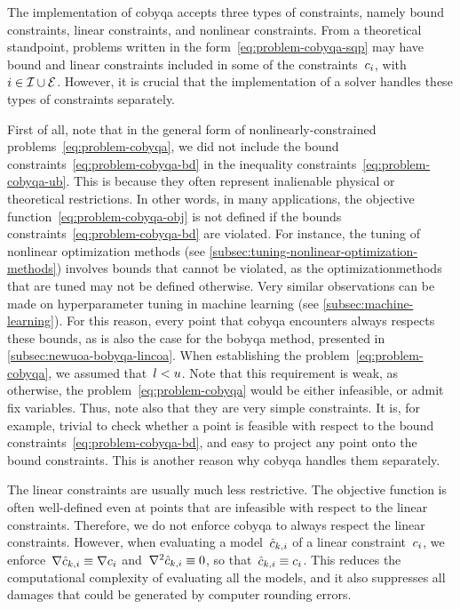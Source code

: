 The implementation of \gls{cobyqa} accepts three types of constraints, namely bound constraints, linear constraints, and nonlinear constraints.
From a theoretical standpoint, problems written in the form~\cref{eq:problem-cobyqa-sqp} may have bound and linear constraints included in some of the constraints~$c_{i}$, with~$i \in \mathcal{I} \cup \mathcal{E}$.
However, it is crucial that the implementation of a solver handles these types of constraints separately.

First of all, note that in the general form of nonlinearly-constrained problems~\cref{eq:problem-cobyqa}, we did not include the bound constraints~\cref{eq:problem-cobyqa-bd} in the inequality constraints~\cref{eq:problem-cobyqa-ub}.
This is because they often represent inalienable physical or theoretical restrictions.
In other words, in many applications, the objective function~\cref{eq:problem-cobyqa-obj} is not defined if the bounds constraints~\cref{eq:problem-cobyqa-bd} are violated.
For instance, the tuning of nonlinear optimization methods (see \cref{subsec:tuning-nonlinear-optimization-methods})  involves bounds that cannot be violated, as the optimizationmethods that are tuned may not be defined otherwise.
Very similar observations can be made on hyperparameter tuning in machine learning (see \cref{subsec:machine-learning}).
For this reason, every point that \gls{cobyqa} encounters always respects these bounds, as is also the case for the \gls{bobyqa} method, presented in \cref{subsec:newuoa-bobyqa-lincoa}.
When establishing the problem~\cref{eq:problem-cobyqa}, we assumed that~$l < u$.
Note that this requirement is weak, as otherwise, the problem~\cref{eq:problem-cobyqa} would be either infeasible, or admit fix variables.
Thus, note also that they are very simple constraints.
It is, for example, trivial to check whether a point is feasible with respect to the bound constraints~\cref{eq:problem-cobyqa-bd}, and easy to project any point onto the bound constraints.
This is another reason why \gls{cobyqa} handles them separately.

The linear constraints are usually much less restrictive.
The objective function is often well-defined even at points that are infeasible with respect to the linear constraints.
Therefore, we do not enforce \gls{cobyqa} to always respect the linear constraints.
However, when evaluating a model~$\conm[k]{i}$ of a linear constraint~$c_{i}$, we enforce~$\nabla \conm[k]{i} \equiv \nabla \con{i}$ and~$\nabla^2 \conm[k]{i} \equiv 0$, so that~$\conm[k]{i} \equiv \con{i}$.
This reduces the computational complexity of evaluating all the models, and it also suppresses all damages that could be generated by computer rounding errors.

